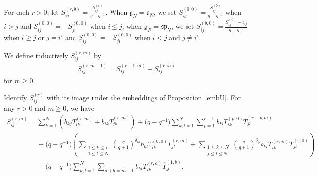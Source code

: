 For each $r>0$, let $S_{ij}^{(r,0)}=\frac{S_{ij}^{(r)}}{q-q^{-1}}$.
When $\mathfrak{g}_N = \mathfrak{o}_N$, we set $S_{ij}^{(0,0)}=\frac{S_{ij}^{(0)}}{q-q^{-1}}$ when $i>j$ and
$S_{ij}^{(0,0)}=-S_{ji}^{(0,0)}$ when $i\le j$; when $\mathfrak{g}_N = \mathfrak{sp}_N$, we set
$S_{ij}^{(0,0)}=\frac{S_{ij}^{(0)}-b_{ij}}{q-q^{-1}}$ when $i\ge j$ or $j=i'$ and $S_{ij}^{(0,0)} = -S_{ji}^{(0,0)}$
when $i<j$ and $j\neq i'$.

We def\/ine inductively $S_{ij}^{(r,m)}$ by
\begin{gather*}
S_{ij}^{(r,m+1)}=S_{ij}^{(r+1,m)}-S_{ij}^{(r,m)}
\end{gather*}
for $m \geq 0$.
\begin{lemma}
Identify $S_{ij}^{(r)}$ with its image under the embeddings of Proposition~{\rm \ref{embU}}.
For any $r>0$ and $m \geq 0$, we have
\begin{gather*}
S_{ij}^{(r,m)}=\sum\limits_{k=1}^N \left(b_{kj} T_{ik}^{(r,m)} + b_{ik} \overline{T}_{jk}^{(r,m)} \right) +
\big(q-q^{-1}\big) \sum\limits_{k,l=1}^N \sum\limits_{p=1}^{r-1} b_{kl} T_{ik}^{(p,0)} \overline{T}_{jl}^{(r-p,m)}
\\
\phantom{S_{ij}^{(r,m)}=}{}
 + \big(q-q^{-1}\big)\!\left(\sum\limits_{\substack{1 \leq k \leq i\\ 1 \leq l \leq N}}\!\left(\frac{q}{q+1}\right)^{\delta_{ik}}\!
b_{kl} T_{ik}^{(0,0)} \overline{T}_{jl}^{(r,m)} + \sum\limits_{\substack{1 \leq k \leq N \\ j \leq l \leq N}}\!
\left(\frac{q}{q+1}\right)^{\delta_{jl}} \! b_{kl} T_{ik}^{(r,m)} \overline{T}_{jl}^{(0,0)} \!\right)
\\
\phantom{S_{ij}^{(r,m)}=}{}
  + \big(q-q^{-1}\big) \sum\limits_{k,l=1}^N \sum\limits_{a+b=m-1} b_{kl} T_{ik}^{(r,a)} \overline{T}_{jl}^{(1,b)}.
\end{gather*}
\end{lemma}

